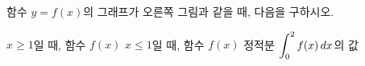 \noindent\begin{minipage}[t]{0.58\linewidth}\vspace{0pt}\raggedright 함수 $y=f(x)$의 그래프가 오른쪽 그림과 같을 때, 다음을 구하시오.\end{minipage}\hfill\begin{minipage}[t]{0.4\linewidth}\vspace{0pt}\centering \resizebox{\ifdim\width>\linewidth\linewidth\else\width\fi}{!}{}\end{minipage}\par
{} $x\ge 1$일 때, 함수 $f(x)$
 $x\le 1$일 때, 함수 $f(x)$
 정적분 $\displaystyle\int_{0}^{2} f(x)\mkern3mu dx$의 값
